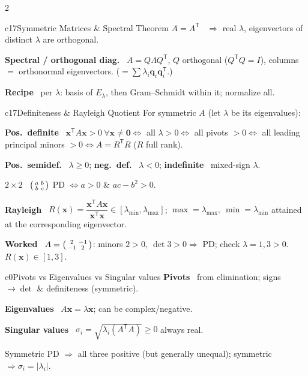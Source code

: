 \documentclass[10pt]{extarticle}
\newcommand{\h}[1]{{\bfseries #1}\ }
\newcommand{\key}[1]{\colorbox{hl}{$#1$}}
\newcommand{\T}{^{\mathsf T}}
\newcommand{\bx}{\mathbf{x}}
\newcommand{\bq}{\mathbf{q}}
\begin{document}
\begin{multicols}{2}
\begin{tbox}{c17}{Symmetric Matrices \& Spectral Theorem}
\h{$A=A\T$} $\Rightarrow$ real $\lambda$, eigenvectors of distinct $\lambda$ are orthogonal.\par
\h{Spectral / orthogonal diag.} \key{A=Q\Lambda Q\T}, $Q$ orthogonal ($Q\T Q{=}I$), columns $=$ orthonormal eigenvectors. ($=\sum\lambda_i\bq_i\bq_i\T$.)\par
\h{Recipe} per $\lambda$: basis of $E_\lambda$, then Gram--Schmidt within it; normalize all.
\end{tbox}

\begin{tbox}{c17}{Definiteness \& Rayleigh Quotient}
For symmetric $A$ (let $\lambda$ be its eigenvalues):\par
\h{Pos.\ definite} $\bx\T A\bx>0\ \forall\bx\neq\mathbf0\iff$ all $\lambda>0\iff$ all pivots $>0\iff$ all leading principal minors $>0\iff A=R\T R$ ($R$ full rank).\par
\h{Pos.\ semidef.} $\lambda\ge0$;\; \h{neg.\ def.} $\lambda<0$;\; \h{indefinite} mixed-sign $\lambda$.\par
\h{$2{\times}2$} $\begin{psmallmatrix}a&b\\b&c\end{psmallmatrix}$ PD $\iff a>0$ \& $ac-b^2>0$.\par
\h{Rayleigh} $R(\bx)=\dfrac{\bx\T A\bx}{\bx\T\bx}\in[\lambda_{\min},\lambda_{\max}]$; \key{\max=\lambda_{\max},\ \min=\lambda_{\min}} attained at the corresponding eigenvector.\par
\h{Worked} $A=\begin{psmallmatrix}2&-1\\-1&2\end{psmallmatrix}$: minors $2>0,\ \det 3>0\Rightarrow$ PD; check $\lambda=1,3>0$. $R(\bx)\in[1,3]$.
\end{tbox}

\begin{tbox}{c0}{Pivots vs Eigenvalues vs Singular values}
\h{Pivots} from elimination; signs $\to\det$ \& definiteness (symmetric).\par
\h{Eigenvalues} $A\bx{=}\lambda\bx$; can be complex/negative.\par
\h{Singular values} $\sigma_i{=}\sqrt{\lambda_i(A\T A)}\ge0$ always real.\par
Symmetric PD $\Rightarrow$ all three positive (but generally unequal); symmetric $\Rightarrow\sigma_i=|\lambda_i|$.
\end{tbox}


\end{multicols}
\end{document}
